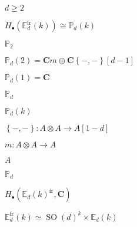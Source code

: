\begin{preview}
\setcounter{equation}{0}%
\( d \geqslant 2 \)
\end{preview}

\begin{preview}
\setcounter{equation}{0}%
\( H_{\bullet}(  \mathbb{E}^{\mathrm{f r}}_d (k) ) \cong \mathbb{P}_d(k) \)
\end{preview}

\begin{preview}
\setcounter{equation}{0}%
\( \mathbb{P}_2 \)
\end{preview}

\begin{preview}
\setcounter{equation}{0}%
\( \mathbb{P}_d(2) = \mathbf{C}m \oplus \mathbf{C}\left\{ -,- \right\}[d-1] \)
\end{preview}

\begin{preview}
\setcounter{equation}{0}%
\( \mathbb{P}_d(1) = \mathbf{C} \)
\end{preview}

\begin{preview}
\setcounter{equation}{0}%
\( \mathbb{P}_d \)
\end{preview}

\begin{preview}
\setcounter{equation}{0}%
\( \mathbb{P}_d(k) \)
\end{preview}

\begin{preview}
\setcounter{equation}{0}%
\( \left\{ -,- \right\}: A \otimes  A \to A[1-d] \)
\end{preview}

\begin{preview}
\setcounter{equation}{0}%
\( m : A \otimes  A \to A \)
\end{preview}

\begin{preview}
\setcounter{equation}{0}%
\( A \)
\end{preview}

\begin{preview}
\setcounter{equation}{0}%
\( \mathbb{P}_d \)
\end{preview}

\begin{preview}
\setcounter{equation}{0}%
\( H_{\bullet}( \mathbb{E}_d(k) ^{\mathrm{f r}} , \mathbf{C}) \)
\end{preview}

\begin{preview}
\setcounter{equation}{0}%
\(  \mathbb{E}^{\mathrm{f r}}_d (k)  \simeq \operatorname{SO}(d) ^k \times \mathbb{E}_d(k) \)
\end{preview}

